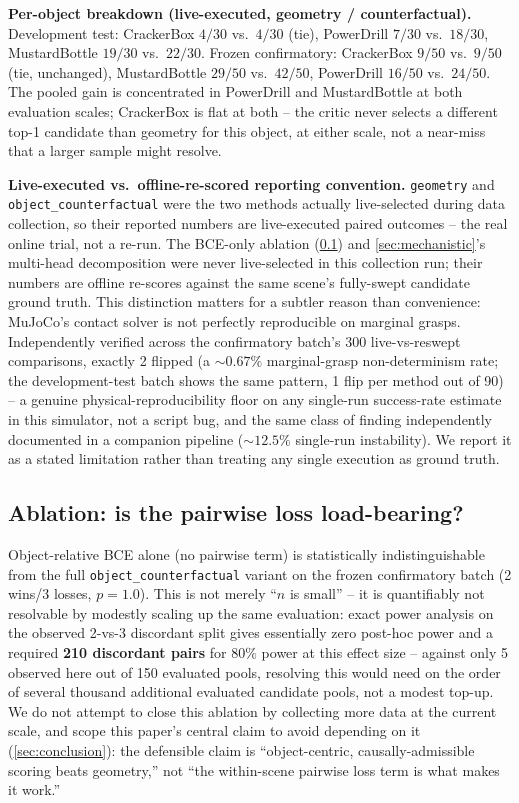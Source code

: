 \documentclass[journal]{IEEEtran}
\begin{document}
\textbf{Per-object breakdown (live-executed, geometry / counterfactual).}
Development test: CrackerBox $4/30$ vs.\ $4/30$ (tie), PowerDrill $7/30$
vs.\ $18/30$, MustardBottle $19/30$ vs.\ $22/30$. Frozen confirmatory:
CrackerBox $9/50$ vs.\ $9/50$ (tie, unchanged), MustardBottle $29/50$ vs.\
$42/50$, PowerDrill $16/50$ vs.\ $24/50$. The pooled gain is concentrated
in PowerDrill and MustardBottle at both evaluation scales; CrackerBox is
flat at both -- the critic never selects a different top-1 candidate than
geometry for this object, at either scale, not a near-miss that a larger
sample might resolve.

\textbf{Live-executed vs.\ offline-re-scored reporting convention.}
\texttt{geometry} and \texttt{object\_counterfactual} were the two methods
actually live-selected during data collection, so their reported numbers
are live-executed paired outcomes -- the real online trial, not a re-run.
The BCE-only ablation (\cref{sec:ablation}) and \cref{sec:mechanistic}'s
multi-head decomposition were never live-selected in this collection run;
their numbers are offline re-scores against the same scene's fully-swept
candidate ground truth. This distinction matters for a subtler reason than
convenience: MuJoCo's contact solver is not perfectly reproducible on
marginal grasps. Independently verified across the confirmatory batch's 300
live-vs-reswept comparisons, exactly 2 flipped (a $\sim\!0.67\%$
marginal-grasp non-determinism rate; the development-test batch shows the
same pattern, 1 flip per method out of 90) -- a genuine
physical-reproducibility floor on any single-run success-rate estimate in
this simulator, not a script bug, and the same class of finding
independently documented in a companion pipeline ($\sim\!12.5\%$
single-run instability). We report it as a stated limitation rather than
treating any single execution as ground truth.

\subsection{Ablation: is the pairwise loss load-bearing?}
\label{sec:ablation}

Object-relative BCE alone (no pairwise term) is statistically
indistinguishable from the full \texttt{object\_counterfactual} variant on
the frozen confirmatory batch (2 wins/3 losses, $p{=}1.0$). This is not
merely ``$n$ is small'' -- it is quantifiably not resolvable by modestly
scaling up the same evaluation: exact power analysis on the observed
2-vs-3 discordant split gives essentially zero post-hoc power and a
required \textbf{210 discordant pairs} for $80\%$ power at this effect
size -- against only 5 observed here out of 150 evaluated pools, resolving
this would need on the order of several thousand additional evaluated
candidate pools, not a modest top-up. We do not attempt to close this
ablation by collecting more data at the current scale, and scope this
paper's central claim to avoid depending on it (\cref{sec:conclusion}): the
defensible claim is ``object-centric, causally-admissible scoring beats
geometry,'' not ``the within-scene pairwise loss term is what makes it
work.''
\end{document}
